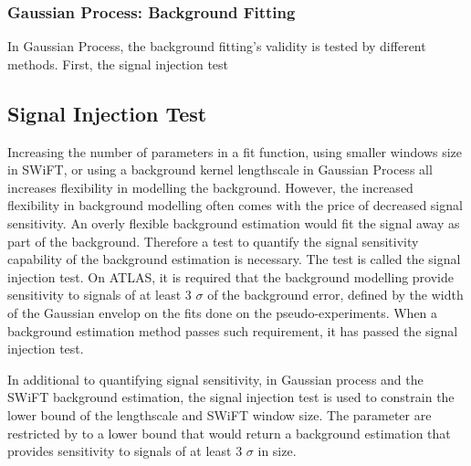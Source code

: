 %
%
%    
%
%
\subsubsection{Gaussian Process: Background Fitting}
In Gaussian Process, the background fitting's validity is tested by different methods. First, the signal injection test 

\subsection{Signal Injection Test}
    \label{sec:signalInjection}
    Increasing the number of parameters in a fit function, using smaller windows size in SWiFT, or using a background kernel lengthscale in Gaussian Process all increases flexibility in modelling the background. However, the increased flexibility in background modelling often comes with the price of decreased signal sensitivity. An overly flexible background estimation would fit the signal away as part of the background. 
    Therefore a test to quantify the signal sensitivity capability of the background estimation is necessary. The test is called the signal injection test. On ATLAS, it is required that the background modelling provide sensitivity to signals of at least 3 $\sigma$ of the background error, defined by the width of the Gaussian envelop on the fits done on the pseudo-experiments. When a background estimation method passes such requirement, it has passed the signal injection test.

    In additional to quantifying signal sensitivity, in Gaussian process and the SWiFT background estimation, the signal injection test is used to constrain the lower bound of the lengthscale and SWiFT window size.
    The parameter are restricted by to a lower bound that would return a background estimation that provides sensitivity to signals of at least 3 $\sigma$ in size.

